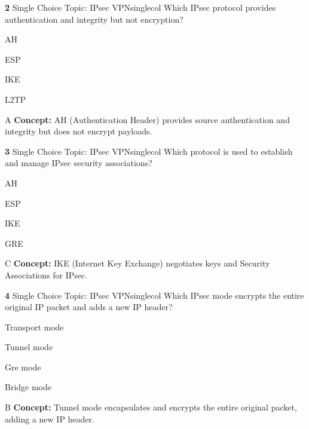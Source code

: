\documentclass[10pt,a4paper]{article}
\begin{document}
\begin{qcard}{\color{white}\textbf{2} \hfill \small Single Choice \textbar{} Topic: IPsec VPN}{singlecol}
Which IPsec protocol provides authentication and integrity but not encryption?

\begin{qoptions}
\item AH
\item ESP
\item IKE
\item L2TP
\end{qoptions}
\begin{explainbox}{A}
\textbf{Concept:} AH (Authentication Header) provides source authentication and integrity but does not encrypt payloads.
\end{explainbox}
\end{qcard}

\begin{qcard}{\color{white}\textbf{3} \hfill \small Single Choice \textbar{} Topic: IPsec VPN}{singlecol}
Which protocol is used to establish and manage IPsec security associations?

\begin{qoptions}
\item AH
\item ESP
\item IKE
\item GRE
\end{qoptions}
\begin{explainbox}{C}
\textbf{Concept:} IKE (Internet Key Exchange) negotiates keys and Security Associations for IPsec.
\end{explainbox}
\end{qcard}

\begin{qcard}{\color{white}\textbf{4} \hfill \small Single Choice \textbar{} Topic: IPsec VPN}{singlecol}
Which IPsec mode encrypts the entire original IP packet and adds a new IP header?

\begin{qoptions}
\item Transport mode
\item Tunnel mode
\item Gre mode
\item Bridge mode
\end{qoptions}
\begin{explainbox}{B}
\textbf{Concept:} Tunnel mode encapsulates and encrypts the entire original packet, adding a new IP header.
\end{explainbox}
\end{qcard}
\end{document}
